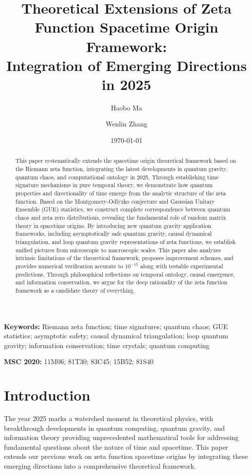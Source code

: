 \documentclass[12pt]{article}
\title{Theoretical Extensions of Zeta Function Spacetime Origin Framework: \\
Integration of Emerging Directions in 2025}
\author{Haobo Ma \and Wenlin Zhang}
\date{\today}
\begin{document}
\maketitle

\begin{abstract}
This paper systematically extends the spacetime origin theoretical framework based on the Riemann zeta function, integrating the latest developments in quantum gravity, quantum chaos, and computational ontology in 2025. Through establishing time signature mechanisms in pure temporal theory, we demonstrate how quantum properties and directionality of time emerge from the analytic structure of the zeta function. Based on the Montgomery-Odlyzko conjecture and Gaussian Unitary Ensemble (GUE) statistics, we construct complete correspondence between quantum chaos and zeta zero distributions, revealing the fundamental role of random matrix theory in spacetime origins. By introducing new quantum gravity application frameworks, including asymptotically safe quantum gravity, causal dynamical triangulation, and loop quantum gravity representations of zeta functions, we establish unified pictures from microscopic to macroscopic scales. This paper also analyzes intrinsic limitations of the theoretical framework, proposes improvement schemes, and provides numerical verification accurate to $10^{-15}$ along with testable experimental predictions. Through philosophical reflections on temporal ontology, causal emergence, and information conservation, we argue for the deep rationality of the zeta function framework as a candidate theory of everything.
\end{abstract}

\textbf{Keywords:} Riemann zeta function; time signatures; quantum chaos; GUE statistics; asymptotic safety; causal dynamical triangulation; loop quantum gravity; information conservation; time crystals; quantum computing

\textbf{MSC 2020:} 11M06; 81T30; 83C45; 15B52; 81S40

\section{Introduction}

The year 2025 marks a watershed moment in theoretical physics, with breakthrough developments in quantum computing, quantum gravity, and information theory providing unprecedented mathematical tools for addressing fundamental questions about the nature of time and spacetime. This paper extends our previous work on zeta function spacetime origins by integrating these emerging directions into a comprehensive theoretical framework.
\end{document}
